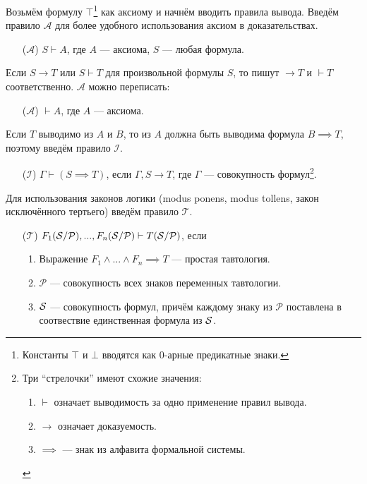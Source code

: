 \newcommand\taut{$\mathcal T$}
\newcommand\axiom{$\mathcal A$}
\newcommand\implic{$\mathcal I$}
\newcommand\Px{\mathcal P}
Возьмём формулу $\top$\footnote{Константы $\top$ и $\bot$ вводятся как
$0$-арные предикатные знаки.}
как аксиому и начнём вводить правила вывода.
Введём правило \axiom{} для более удобного использования аксиом в доказательствах.
\begin{enumerate}
	\item[(\axiom)]{}$S\vdash A$, где $A$ --- аксиома, $S$ --- любая формула.
\end{enumerate}

Если $S\to T$ или $S\vdash T$ для произвольной формулы $S$,
то пишут $\to T$ и $\vdash T$ соответственно. \axiom{} можно переписать:
\begin{enumerate}
	\item[(\axiom)]{}$\vdash A$, где $A$ --- аксиома.
\end{enumerate}

Если $T$ выводимо из $A$ и $B$, то из $A$ должна быть выводима формула $B\implies T$,
поэтому введём правило \implic{}.
\begin{enumerate}
	\item[(\implic)]{}${\Gamma\vdash (S\implies T)}$, если $\Gamma,S\to T$,
		где $\Gamma$ --- совокупность формул\footnote[][-2cm]{
			Три ``стрелочки'' имеют схожие значения:
			\begin{enumerate}
				\item{}$\vdash$ означает выводимость за одно применение правил вывода.
				\item{}$\to$ означает доказуемость.
				\item{}$\implies$ --- знак из алфавита формальной системы.
			\end{enumerate}
		}.
\end{enumerate}

Для использования законов логики (modus ponens, modus tollens, закон
исключённого тертьего) введём правило \taut{}.
\begin{enumerate}
	\item[(\taut)]{}$F_1(\Sx/\Px),...,F_n(\Sx/\Px)\vdash T(\Sx/\Px)$, если
		\begin{enumerate}
			\item{}Выражение ${F_1\land...\land F_n\implies T}$ --- простая тавтология.
			\item{}$\Px$ --- совокупность всех знаков переменных тавтологии.
			\item{}$\mathcal S$ --- совокупность формул, причём каждому знаку из $\Px$
				поставлена в соотвествие единственная формула из $\mathcal S$.
		\end{enumerate}
\end{enumerate}

